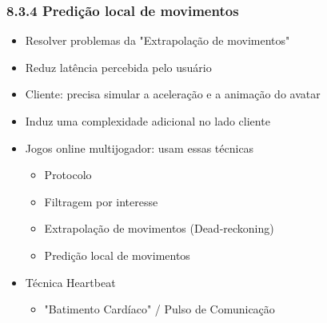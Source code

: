 \documentclass{beamer}
\begin{document}
\begin{frame}
  \frametitle{8.3.4 Predição local de movimentos}
  \begin{itemize}
    \item Resolver problemas da "Extrapolação de movimentos"
    \item Reduz latência percebida pelo usuário
    \item Cliente: precisa simular a aceleração e a animação do avatar
    \item Induz uma complexidade adicional no lado cliente
    \item Jogos online multijogador: usam essas técnicas
    \begin{itemize}
      \item Protocolo
      \item Filtragem por interesse
      \item Extrapolação de movimentos (Dead-reckoning)
      \item Predição local de movimentos
    \end{itemize}
    \item Técnica Heartbeat
    \begin{itemize}
      \item "Batimento Cardíaco" / Pulso de Comunicação
      \begin{flushright}
        \scriptsize
          \cite{Eduardo2002}
      \end{flushright}
    \end{itemize}
  \end{itemize}
\end{frame}
\end{document}
